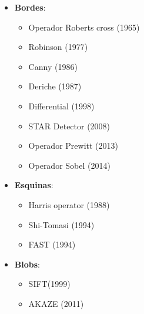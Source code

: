 \begin{itemize}
    \item \textbf{Bordes}:      %
    \begin{itemize}
        \item Operador Roberts cross (1965) \cite{roberts1965machine,angenent2006mathematical}
        \item Robinson (1977) \cite{robinson1977edge}
        \item Canny (1986) \cite{canny1986computational}
        \item Deriche (1987) \cite{deriche1987using}
        \item Differential (1998) \cite{lindeberg1998edge}
        \item STAR Detector (2008) \cite{agrawal2008censure}
        \item Operador Prewitt (2013) \cite{dim2013alternative}
        \item Operador Sobel (2014) \cite{sobelIrwin2014}
    \end{itemize}

    \item \textbf{Esquinas}:    %
    \begin{itemize}
        \item Harris operator (1988) \cite{Harris88alvey}
        \item Shi-Tomasi (1994) \cite{Shi-and-Tomasi--good-features-to-track}
        \item FAST (1994) \cite{rosten2005fusing,rosten2006machine}
    \end{itemize}
    
    \item \textbf{Blobs}:       %
    \begin{itemize}
        \item SIFT\footnotemark[2] (1999) \cite{sift}
        \item AKAZE (2011) \cite{akaze-alcantarilla2011fast}
    \end{itemize}
    

\end{itemize}
